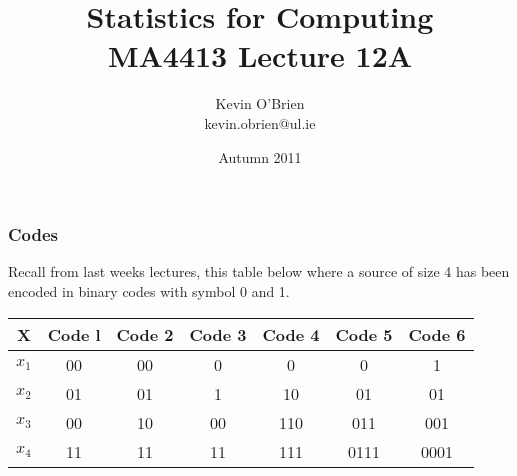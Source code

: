 \documentclass[a4]{beamer}
\title[MA4413]{Statistics for Computing \\ {\normalsize MA4413 Lecture 12A}}
\author[Kevin O'Brien]{Kevin O'Brien \\ {\scriptsize kevin.obrien@ul.ie}}
\date{Autumn 2011}
\institute[Maths \& Stats]{Dept. of Mathematics \& Statistics, \\ University \textit{of} Limerick}
\begin{document}
\begin{frame}
\titlepage
\end{frame}
\begin{frame}
\frametitle{Codes}
Recall from last weeks lectures, this table below where a source of
size 4 has been encoded in binary codes with symbol 0 and 1.\\ \bigskip
\begin{center}
\begin{tabular}{|c| c| c| c| c| c| c|}
\hline
X& Code l& Code 2& Code 3 &Code 4& Code 5& Code 6\\\hline
$x_1$& 00& 00 &0 &0 &0 &1\\
$x_2$& 01& 01 &1 &10 &01 &01\\
$x_3$ &00 &10& 00& 110& 011 &001\\
$x_4$ &11& 11& 11& 111 &0111 &0001\\\hline
\end{tabular}
\end{center}
\end{frame}
\end{document}
